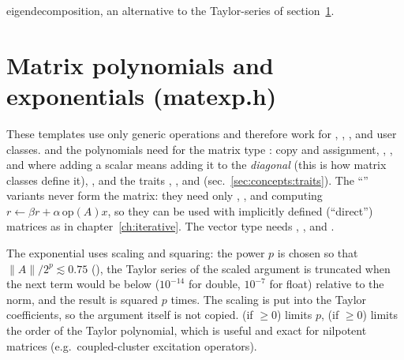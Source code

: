 \begin{lareference}
{eigendecomposition, an alternative to the Taylor-series  of section~\ref{sec:nonclass:matexp}.}
\end{lareference}

\section{Matrix polynomials and exponentials (matexp.h)}\label{sec:nonclass:matexp}
These templates use only generic operations and therefore work for , ,
,  and user classes.  and the polynomials need for the matrix type
: copy and assignment, , ,  and  where adding a scalar
means adding it to the \emph{diagonal} (this is how \LA{} matrix classes define it), , and the traits
, ,  and 
(sec.~\ref{sec:concepts:traits}). The ``'' variants never form the matrix: they need only
, ,  and
 computing $r\leftarrow\beta r+\alpha\,\mathrm{op}(A)x$,
so they can be used with implicitly defined (``direct'') matrices as in chapter~\ref{ch:iterative}. The vector type 
needs , ,  and .

The exponential uses scaling and squaring: the power $p$ is chosen so that $\|A\|/2^p\lesssim 0.75$
(), the Taylor series of the scaled argument is truncated when the next term would be below
 ($10^{-14}$ for double, $10^{-7}$ for float) relative to the norm, and the result is squared $p$ times. The scaling is put into the Taylor coefficients,
so the argument itself is not copied.  (if ${}\ge0$) limits $p$,  (if ${}\ge0$) limits
the order of the Taylor polynomial, which is useful and exact for nilpotent matrices (e.g.\ coupled-cluster excitation
operators).


